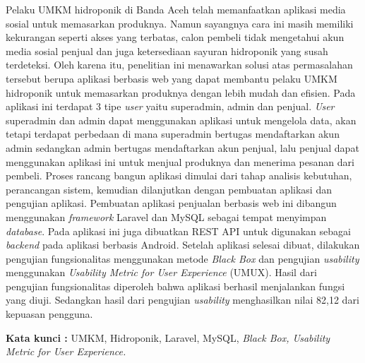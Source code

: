 \begin{abstractind}

Pelaku UMKM hidroponik di Banda Aceh telah memanfaatkan aplikasi media sosial untuk memasarkan produknya. Namun sayangnya cara ini masih memiliki kekurangan seperti akses yang terbatas, calon pembeli tidak mengetahui akun media sosial penjual dan juga ketersediaan sayuran hidroponik yang susah terdeteksi. Oleh karena itu, penelitian ini menawarkan solusi atas permasalahan tersebut berupa aplikasi berbasis web yang dapat membantu pelaku UMKM hidroponik untuk memasarkan produknya dengan lebih mudah dan efisien. Pada aplikasi ini terdapat 3 tipe \textit{user} yaitu superadmin, admin dan penjual. \textit{User} superadmin dan admin dapat menggunakan aplikasi untuk mengelola data, akan tetapi terdapat perbedaan di mana superadmin bertugas mendaftarkan akun admin sedangkan admin bertugas mendaftarkan akun penjual, lalu penjual dapat menggunakan aplikasi ini untuk menjual produknya dan menerima pesanan dari pembeli. Proses rancang bangun aplikasi dimulai dari tahap analisis kebutuhan, perancangan sistem, kemudian dilanjutkan dengan pembuatan aplikasi dan pengujian aplikasi. Pembuatan aplikasi penjualan berbasis web ini dibangun menggunakan \textit{framework} Laravel dan MySQL sebagai tempat menyimpan \textit{database}. Pada aplikasi ini juga dibuatkan REST API untuk digunakan sebagai \textit{backend} pada aplikasi berbasis Android. Setelah aplikasi selesai dibuat, dilakukan pengujian fungsionalitas menggunakan metode \textit{Black Box} dan pengujian \textit{usability} menggunakan \textit{Usability Metric for User Experience} (UMUX). Hasil dari pengujian fungsionalitas diperoleh bahwa aplikasi berhasil menjalankan fungsi yang diuji. Sedangkan hasil dari pengujian \textit{usability} menghasilkan nilai 82,12 dari kepuasan pengguna.




\bigskip
\noindent
\textbf{Kata kunci :} UMKM, Hidroponik, Laravel, MySQL, \textit{Black Box, Usability Metric for User Experience.}
\end{abstractind}